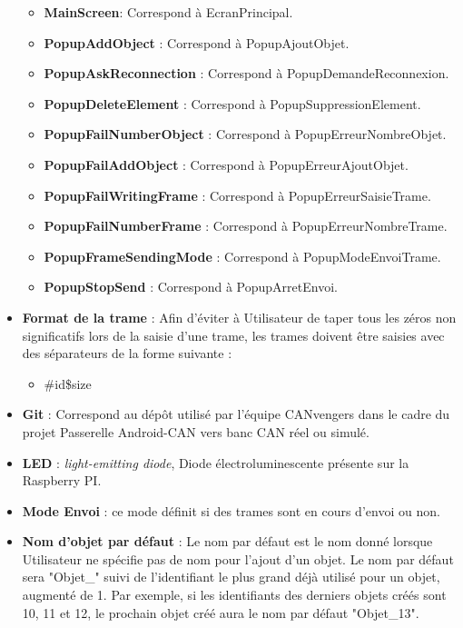 \begin{itemize}
        \begin{itemize}
            \item \textbf{MainScreen}: Correspond à EcranPrincipal.
            \item \textbf{PopupAddObject} : Correspond à PopupAjoutObjet.
            \item \textbf{PopupAskReconnection} : Correspond à PopupDemandeReconnexion.
            \item \textbf{PopupDeleteElement} : Correspond à PopupSuppressionElement. 
            \item \textbf{PopupFailNumberObject} : Correspond à PopupErreurNombreObjet.
            \item \textbf{PopupFailAddObject} : Correspond à PopupErreurAjoutObjet.
            \item \textbf{PopupFailWritingFrame} : Correspond à PopupErreurSaisieTrame.
            \item \textbf{PopupFailNumberFrame} : Correspond à PopupErreurNombreTrame.
            \item \textbf{PopupFrameSendingMode} : Correspond à PopupModeEnvoiTrame.
            \item \textbf{PopupStopSend} : Correspond à PopupArretEnvoi.\newline
        \end{itemize}
    \item \textbf{Format de la trame} : Afin d'éviter à Utilisateur de taper tous les zéros non significatifs lors de la saisie d'une trame, les trames doivent être saisies avec des séparateurs de la forme suivante : 
    \begin{itemize}
        \item \#id\$size\@@message \newline
    \end{itemize}
    \item \textbf{Git} : Correspond au dépôt utilisé par l'équipe CANvengers dans le cadre du projet Passerelle Android-CAN vers banc CAN réel ou simulé.\newline
    \item \textbf{LED} : \textit{light-emitting diode}, Diode électroluminescente présente sur la Raspberry PI.\newline
    \item \textbf{Mode Envoi} : ce mode définit si des trames sont en cours d'envoi ou non.\newline
    \item \textbf{Nom d'objet par défaut} : Le nom par défaut est le nom donné lorsque Utilisateur ne spécifie pas de nom pour l'ajout d'un objet. Le nom par défaut sera "Objet\_" suivi de l'identifiant le plus grand déjà utilisé pour un objet, augmenté de 1. Par exemple, si les identifiants des derniers objets créés sont 10, 11 et 12, le prochain objet créé aura le nom par défaut "Objet\_13".\newline

\end{itemize}
